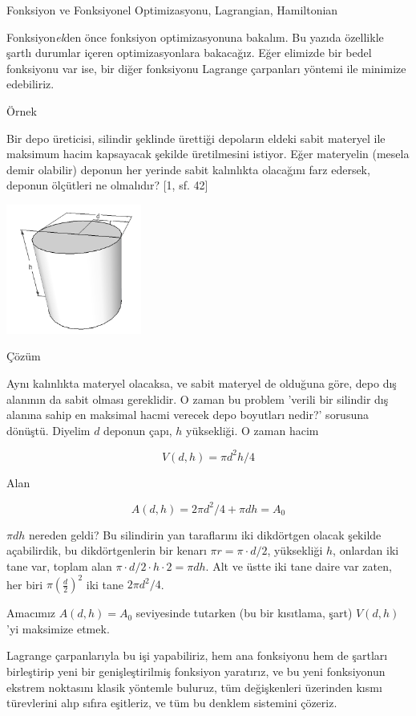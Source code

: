 \documentclass[12pt,fleqn]{article}\usepackage{../../common}
\begin{document}
Fonksiyon ve Fonksiyonel Optimizasyonu, Lagrangian, Hamiltonian

Fonksiyon{\em el}den önce fonksiyon optimizasyonuna bakalım. Bu yazıda
özellikle şartlı durumlar içeren optimizasyonlara bakacağız. Eğer elimizde
bir bedel fonksiyonu var ise, bir diğer fonksiyonu Lagrange çarpanları
yöntemi ile minimize edebiliriz.

Örnek

Bir depo üreticisi, silindir şeklinde ürettiği depoların eldeki sabit
materyel ile maksimum hacim kapsayacak şekilde üretilmesini istiyor. Eğer
materyelin (mesela demir olabilir) deponun her yerinde sabit kalınlıkta
olacağını farz edersek, deponun ölçütleri ne olmalıdır? [1, sf. 42]

\includegraphics[width=12em]{cylinder.png}

Çözüm

Aynı kalınlıkta materyel olacaksa, ve sabit materyel de olduğuna göre, depo
dış alanının da sabit olması gereklidir. O zaman bu problem 'verili bir
silindir dış alanına sahip en maksimal hacmi verecek depo boyutları nedir?'
sorusuna dönüştü. Diyelim $d$ deponun çapı, $h$ yüksekliği. O zaman hacim

$$
V(d,h) = \pi d^2 h / 4
$$

Alan

$$
A(d,h) = 2 \pi d^2 / 4 + \pi d h = A_0
$$

$\pi d h$ nereden geldi? Bu silindirin yan taraflarını iki dikdörtgen
olacak şekilde açabilirdik, bu dikdörtgenlerin bir kenarı
$\pi r = \pi \cdot d/2$, yüksekliği $h$, onlardan iki tane var, toplam alan
$\pi \cdot d/2 \cdot h \cdot 2 = \pi d h$. Alt ve üstte iki tane daire var
zaten, her biri $\pi \left( \frac{d}{2} \right)^2$ iki tane
$2 \pi d^2 / 4 $. 

Amacımız $A(d,h) = A_0$ seviyesinde tutarken (bu bir kısıtlama, şart)
$V(d,h)$'yi maksimize etmek. 

Lagrange çarpanlarıyla bu işi yapabiliriz, hem ana fonksiyonu hem de
şartları birleştirip yeni bir genişleştirilmiş fonksiyon yaratırız, ve bu
yeni fonksiyonun ekstrem noktasını klasik yöntemle buluruz, tüm
değişkenleri üzerinden kısmı türevlerini alıp sıfıra eşitleriz, ve tüm bu
denklem sistemini çözeriz. 
\end{document}
